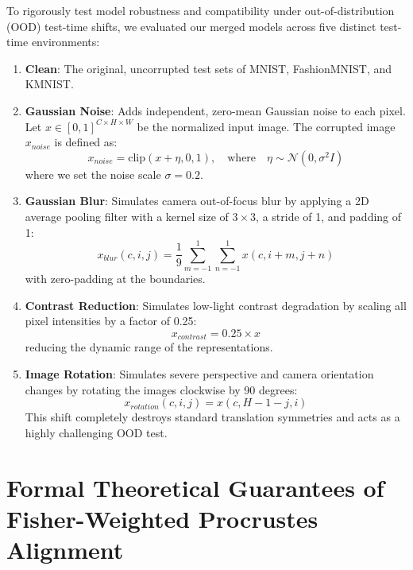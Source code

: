 \documentclass{article}
\theoremstyle{plain}
\theoremstyle{definition}
\theoremstyle{remark}
\begin{document}
To rigorously test model robustness and compatibility under out-of-distribution (OOD) test-time shifts, we evaluated our merged models across five distinct test-time environments:
\begin{enumerate}
    \item \textbf{Clean}: The original, uncorrupted test sets of MNIST, FashionMNIST, and KMNIST.
    \item \textbf{Gaussian Noise}: Adds independent, zero-mean Gaussian noise to each pixel. Let $x \in [0, 1]^{C \times H \times W}$ be the normalized input image. The corrupted image $x_{noise}$ is defined as:
    \begin{equation}
        x_{noise} = \text{clip}(x + \eta, 0, 1), \quad \text{where} \quad \eta \sim \mathcal{N}(0, \sigma^2 I)
    \end{equation}
    where we set the noise scale $\sigma = 0.2$.
    \item \textbf{Gaussian Blur}: Simulates camera out-of-focus blur by applying a 2D average pooling filter with a kernel size of $3 \times 3$, a stride of 1, and padding of 1:
    \begin{equation}
        x_{blur}(c, i, j) = \frac{1}{9} \sum_{m=-1}^1 \sum_{n=-1}^1 x(c, i+m, j+n)
    \end{equation}
    with zero-padding at the boundaries.
    \item \textbf{Contrast Reduction}: Simulates low-light contrast degradation by scaling all pixel intensities by a factor of 0.25:
    \begin{equation}
        x_{contrast} = 0.25 \times x
    \end{equation}
    reducing the dynamic range of the representations.
    \item \textbf{Image Rotation}: Simulates severe perspective and camera orientation changes by rotating the images clockwise by 90 degrees:
    \begin{equation}
        x_{rotation}(c, i, j) = x(c, H - 1 - j, i)
    \end{equation}
    This shift completely destroys standard translation symmetries and acts as a highly challenging OOD test.
\end{enumerate}

\section{Formal Theoretical Guarantees of Fisher-Weighted Procrustes Alignment}
\label{app:theory}
\end{document}
